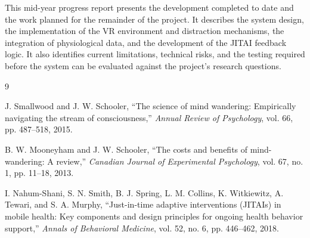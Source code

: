 \documentclass[11pt,a4paper]{article}
\begin{document}
This mid-year progress report presents the development completed to date and the
work planned for the remainder of the project. It describes the system design,
the implementation of the VR environment and distraction mechanisms, the
integration of physiological data, and the development of the JITAI feedback
logic. It also identifies current limitations, technical risks, and the testing
required before the system can be evaluated against the project's research
questions.

\begin{thebibliography}{9}

J. Smallwood and J. W. Schooler,
``The science of mind wandering: Empirically navigating the stream of
consciousness,''
\emph{Annual Review of Psychology}, vol. 66, pp. 487--518, 2015.

B. W. Mooneyham and J. W. Schooler,
``The costs and benefits of mind-wandering: A review,''
\emph{Canadian Journal of Experimental Psychology}, vol. 67, no. 1,
pp. 11--18, 2013.

I. Nahum-Shani, S. N. Smith, B. J. Spring, L. M. Collins, K. Witkiewitz,
A. Tewari, and S. A. Murphy,
``Just-in-time adaptive interventions (JITAIs) in mobile health: Key
components and design principles for ongoing health behavior support,''
\emph{Annals of Behavioral Medicine}, vol. 52, no. 6, pp. 446--462, 2018.

\end{thebibliography}
\end{document}

